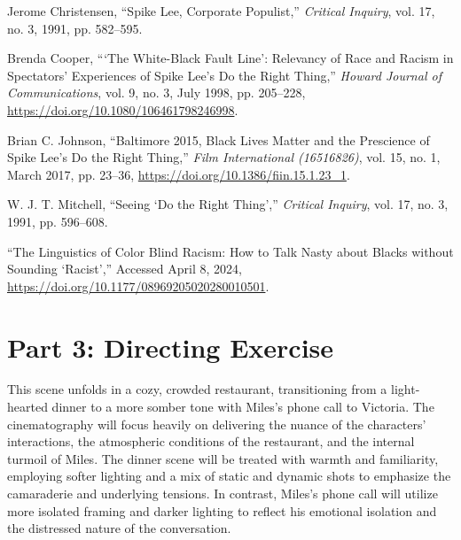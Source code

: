 \documentclass[12pt]{article}
\begin{document}
\clearpage

\begin{thebibliography}{5}

Jerome Christensen,
``Spike Lee, Corporate Populist,''
\textit{Critical Inquiry},
vol. 17, no. 3, 1991, pp. 582–595.

Brenda Cooper,
``‘The White-Black Fault Line’: Relevancy of Race and Racism in Spectators’ Experiences of Spike Lee’s Do the Right Thing,''
\textit{Howard Journal of Communications},
vol. 9, no. 3, July 1998, pp. 205–228,
\url{https://doi.org/10.1080/106461798246998}.

Brian C. Johnson,
``Baltimore 2015, Black Lives Matter and the Prescience of Spike Lee’s Do the Right Thing,''
\textit{Film International (16516826)},
vol. 15, no. 1, March 2017, pp. 23–36,
\url{https://doi.org/10.1386/fiin.15.1.23_1}.

W. J. T. Mitchell,
``Seeing ‘Do the Right Thing’,''
\textit{Critical Inquiry},
vol. 17, no. 3, 1991, pp. 596–608.

``The Linguistics of Color Blind Racism: How to Talk Nasty about Blacks without Sounding ‘Racist’,''
Accessed April 8, 2024,
\url{https://doi.org/10.1177/08969205020280010501}.

\end{thebibliography}

\newpage



\newpage

\section*{Part 3: Directing Exercise}

This scene unfolds in a cozy, crowded restaurant, transitioning from a light-hearted dinner to a more somber tone with Miles's phone call to Victoria. The cinematography will focus heavily on delivering the nuance of the characters' interactions, the atmospheric conditions of the restaurant, and the internal turmoil of Miles. The dinner scene will be treated with warmth and familiarity, employing softer lighting and a mix of static and dynamic shots to emphasize the camaraderie and underlying tensions. In contrast, Miles's phone call will utilize more isolated framing and darker lighting to reflect his emotional isolation and the distressed nature of the conversation.
\end{document}
